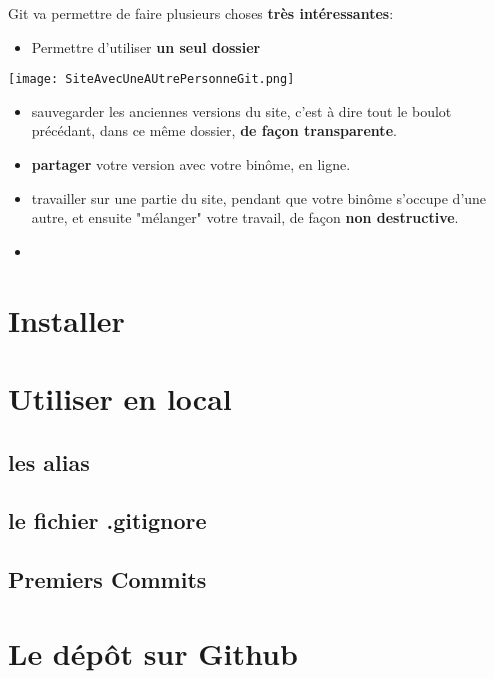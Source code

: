 \documentclass[10pt]{beamer}
\begin{document}
\begin{frame}
Git va permettre de faire plusieurs choses \textbf{très intéressantes}:
\begin{itemize}
\item Permettre d'utiliser \textbf{un seul dossier}
\end{itemize}
\texttt{[image: SiteAvecUneAUtrePersonneGit.png]}

\begin{itemize}
\item sauvegarder les anciennes versions du site, c'est à dire tout le boulot précédant, dans ce même dossier, \textbf{de façon transparente}.
\item \textbf{partager} votre version avec votre binôme, en ligne.
\item travailler sur une partie du site, pendant que votre binôme s'occupe d'une autre, et ensuite "mélanger" votre travail, de façon \textbf{non destructive}.
\item 
\end{itemize}

\end{frame}

\begin{frame}

\end{frame}


\section{Installer}



\section{Utiliser en local}

\subsection{les alias}

\subsection{le fichier .gitignore}
\subsection{Premiers Commits}


\section{Le dépôt sur Github}
\end{document}
